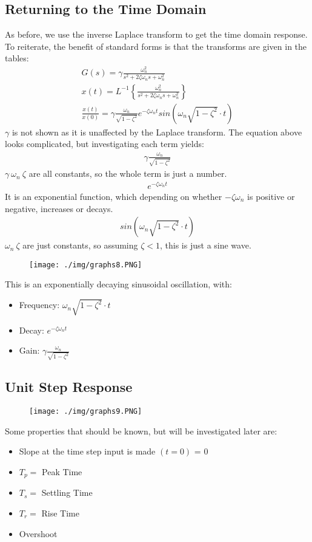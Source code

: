 \subsection{Returning to the Time Domain}
As before, we use the inverse Laplace transform to get the time domain response. To reiterate, the benefit of standard forms is that the transforms are given in the tables:
\begin{gather}
  G(s) = \gamma \frac{\omega_n^2}{s^2 + 2\zeta \omega_n s + \omega_n^2} \\
  x(t) = L^{-1} \left\{\frac{\omega_n^2}{s^2 + 2\zeta \omega_n s + \omega_n^2} \right\} \\
  \frac{x(t)}{x(0)} = \gamma \frac{\omega_n}{\sqrt{1-\zeta^2}}e^{-\zeta \omega_n t} sin(\omega_n \sqrt{1-\zeta^2}\cdot t)
\end{gather}
$\gamma$ is not shown as it is unaffected by the Laplace transform. The equation above looks complicated, but investigating each term yields:
\begin{gather}
  \gamma \frac{\omega_n}{\sqrt{1-\zeta^2}}
\end{gather}
$\gamma \ \omega_n \ \zeta$ are all constants, so the whole term is just a number.
\begin{gather}
  e^{-\zeta \omega_n t}
\end{gather}
It is an exponential function, which depending on whether $-\zeta \omega_n$ is positive or negative, increases or decays.
\begin{gather}
  sin(\omega_n \sqrt{1-\zeta^2}\cdot t)
\end{gather}
$\omega_n \ \zeta$ are just constants, so assuming $\zeta < 1$, this is just a sine wave.
\begin{figure}[H]
  \centering
  \texttt{[image: ./img/graphs8.PNG]}
\end{figure}
This is an exponentially decaying sinusoidal oscillation, with:
\begin{itemize}
  \item Frequency: $\omega_n \sqrt{1-\zeta^2}\cdot t$
  \item Decay: $e^{-\zeta \omega_n t}$
  \item Gain: $\gamma \frac{\omega_n}{\sqrt{1-\zeta^2}}$
\end{itemize}
\subsection{Unit Step Response}
\begin{figure}[H]
  \centering
  \texttt{[image: ./img/graphs9.PNG]}
\end{figure}
Some properties that should be known, but will be investigated later are:
\begin{itemize}
  \item Slope at the time step input is made $(t=0)$ = 0
  \item $T_p=$ Peak Time
  \item $T_s=$ Settling Time
  \item $T_r=$ Rise Time
  \item Overshoot
\end{itemize}
